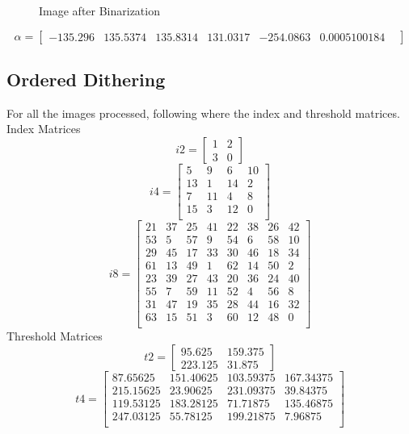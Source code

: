 \documentclass{article}
\begin{document}
\begin{enumerate}
\begin{figure}[H]
        \caption{Image after Binarization}
        \label{fig:Image after Binarization}
    \end{figure}
    \[
    \alpha=
    \begin{bmatrix} 
     -135.296 &
     135.5374 &
     135.8314 &
     131.0317 &
     -254.0863 &
     0.0005100184 &
    \end{bmatrix}
    \]
    \end{enumerate}
    \subsection{Ordered Dithering}
    For all the images processed, following where the index and threshold matrices. 
    Index Matrices
    \[
    i2=
    \begin{bmatrix} 
     1	& 2 \\
3	& 0 
    \end{bmatrix}
    \]
     \[
    i4=
    \begin{bmatrix} 
     5	& 9	& 6	& 10 \\
13	& 1	& 14 &	2 \\
7	& 11	& 4	& 8 \\
15	& 3	& 12	& 0 \\
    \end{bmatrix}
    \]
     \[
    i8=
    \begin{bmatrix} 
     21	& 37	& 25	& 41	& 22	& 38	& 26	& 42 \\
53	& 5	& 57	& 9	& 54	& 6	& 58 &	10 \\
29	& 45	& 17	& 33	& 30	& 46	& 18	& 34\\
61	& 13	& 49	& 1	& 62	& 14	& 50	& 2 \\
23	& 39	& 27	& 43	& 20	& 36	& 24	& 40\\
55	& 7	& 59	& 11	& 52	& 4	& 56	& 8 \\
31	& 47	& 19	& 35	& 28	& 44	& 16	& 32 \\
63	& 15	& 51	& 3	& 60	& 12	& 48	& 0 \\
    \end{bmatrix}
    \] 
    Threshold Matrices
    \[
    t2=
    \begin{bmatrix} 
    95.625 &	159.375 \\
223.125	& 31.875 
    \end{bmatrix}
    \]
    \[
    t4=
    \begin{bmatrix} 
    87.65625 &	151.40625 & 103.59375 & 167.34375 \\
215.15625 &	23.90625 &	231.09375 &	39.84375 \\
119.53125 &	183.28125 &	71.71875 &	135.46875 \\
247.03125 &	55.78125 &	199.21875 &	7.96875 \\
    \end{bmatrix}
    \]
\end{document}

